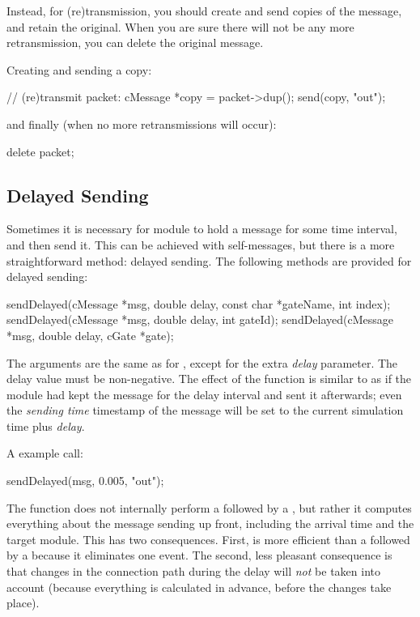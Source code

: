 Instead, for (re)transmission, you should create and
send copies of the message, and retain the original.
When you are sure there will not be any more retransmission,
you can delete the original message.

Creating and sending a copy:

\begin{cpp}
// (re)transmit packet:
cMessage *copy = packet->dup();
send(copy, "out");
\end{cpp}

and finally (when no more retransmissions will occur):

\begin{cpp}
delete packet;
\end{cpp}


\subsection{Delayed Sending}
\label{sec:simple-modules:delayed-sending}

Sometimes it is necessary for module to hold a message for some time interval,
and then send it. This can be achieved with self-messages, but there is a
more straightforward method: delayed sending. The
following methods are provided for delayed sending:

\begin{cpp}
sendDelayed(cMessage *msg, double delay, const char *gateName, int index);
sendDelayed(cMessage *msg, double delay, int gateId);
sendDelayed(cMessage *msg, double delay, cGate *gate);
\end{cpp}

The arguments are the same as for , except for the extra
\textit{delay} parameter. The delay value must be non-negative.
The effect of the function is similar to as if the module
had kept the message for the delay interval and sent it afterwards;
even the \textit{sending time} timestamp of the message will be set to
the current simulation time plus \textit{delay}.

A example call:

\begin{cpp}
sendDelayed(msg, 0.005, "out");
\end{cpp}

The  function does not internally perform a
 followed by a , but rather it computes
everything about the message sending up front, including the arrival time
and the target module. This has two consequences. First,
 is more efficient than a 
followed by a  because it eliminates one event. The second, less
pleasant consequence is that changes in the connection path during the
delay will \textit{not} be taken into account (because everything is
calculated in advance, before the changes take place).

